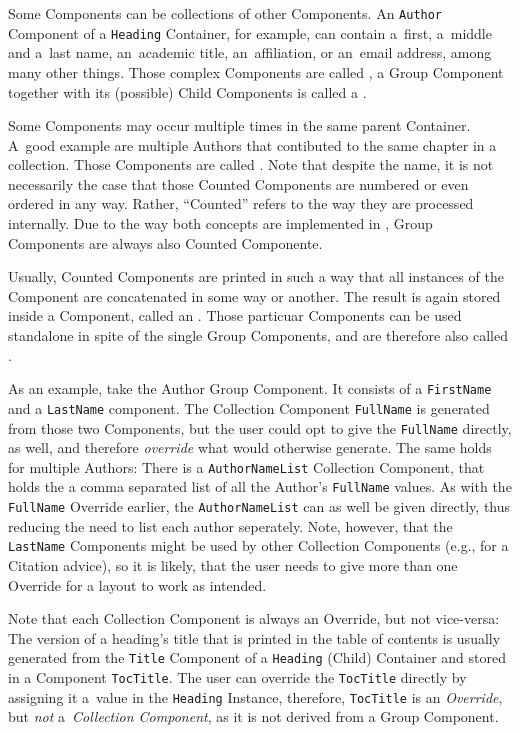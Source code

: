 Some Components can be collections of other Components. An
\texttt{Author} Component of a \texttt{Heading} Container, for
example, can contain a~first, a~middle and a~last name, an~academic
title, an~affiliation, or an~email address, among many other
things. Those complex Components are called , a Group Component together with its (possible) Child
Components is called a .

Some Components may occur multiple times in the same parent
Container. A~good example are multiple Authors that contibuted to the
same chapter in a collection. Those Components are called
. Note that despite
the name, it is not necessarily the case that those Counted Components
are numbered or even ordered in any way. Rather, “Counted” refers to
the way they are processed internally. Due to the way both concepts
are implemented in {\CoCoTeX}, Group Components are always also
Counted Componente.

Usually, Counted Components are printed in such a way that all
instances of the Component are concatenated in some way or
another. The result is again stored inside a Component, called an
. Those particuar Components can be
used standalone in spite of the single Group Components, and are
therefore also called .

As an example, take the Author Group Component. It consists of a
\texttt{FirstName} and a \texttt{LastName} component. The Collection
Component \texttt{FullName} is generated from those two Components,
but the user could opt to give the \texttt{FullName} directly, as
well, and therefore \textit{override} what {\CoCoTeX} would otherwise
generate. The same holds for multiple Authors: There is a
\texttt{AuthorNameList} Collection Component, that holds the a comma
separated list of all the Author's \texttt{FullName} values. As with
the \texttt{FullName} Override earlier, the \texttt{AuthorNameList}
can as well be given directly, thus reducing the need to list each
author seperately.  Note, however, that the \texttt{LastName}
Components might be used by other Collection Components (e.g., for a
Citation advice), so it is likely, that the user needs to give more
than one Override for a layout to work as intended.

Note that each Collection Component is always an Override, but not
vice-versa: The version of a heading's title that is printed in the
table of contents is usually generated from the \texttt{Title}
Component of a \texttt{Heading} (Child) Container and stored in a
Component \texttt{TocTitle}. The user can override the
\texttt{TocTitle} directly by assigning it a~value in the
\texttt{Heading} Instance, therefore, \texttt{TocTitle} is an
\textit{Override}, but \textit{not} a~\textit{Collection Component},
as it is not derived from a Group Component.


